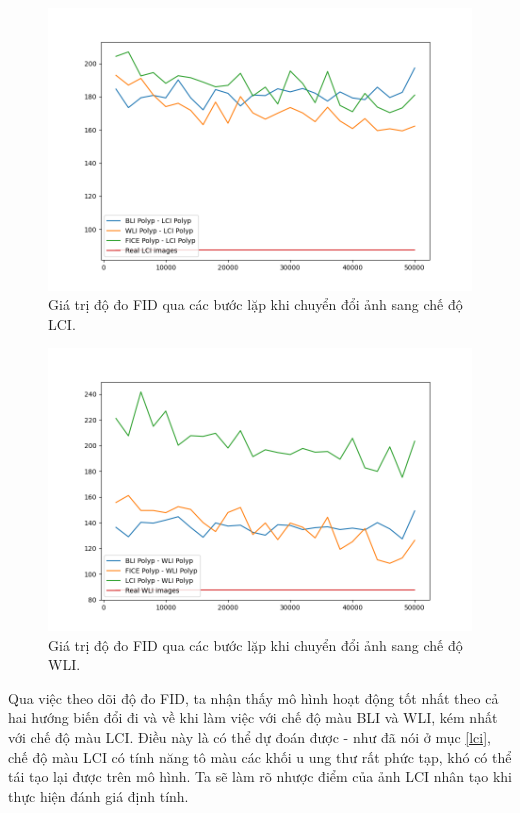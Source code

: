 \documentclass[12pt]{extreport}
\begin{document}
\begin{figure}[H]
    \centering
    \includegraphics[width=\linewidth]{fid/FID_LCI.png}
    \caption{Giá trị độ đo FID qua các bước lặp khi chuyển đổi ảnh sang chế độ LCI.}
\end{figure}

\begin{figure}[H]
    \centering
    \includegraphics[width=\linewidth]{fid/FID_WLI.png}
    \caption{Giá trị độ đo FID qua các bước lặp khi chuyển đổi ảnh sang chế độ WLI.}
\end{figure}

Qua việc theo dõi độ đo FID, ta nhận thấy mô hình hoạt động tốt nhất theo cả hai hướng biến đổi đi và về khi làm việc với chế độ màu BLI và WLI, kém nhất với chế độ màu LCI. Điều này là có thể dự đoán được - như đã nói ở mục \ref{lci}, chế độ màu LCI có tính năng tô màu các khối u ung thư rất phức tạp, khó có thể tái tạo lại được trên mô hình. Ta sẽ làm rõ nhược điểm của ảnh LCI nhân tạo khi thực hiện đánh giá định tính.
\end{document}
